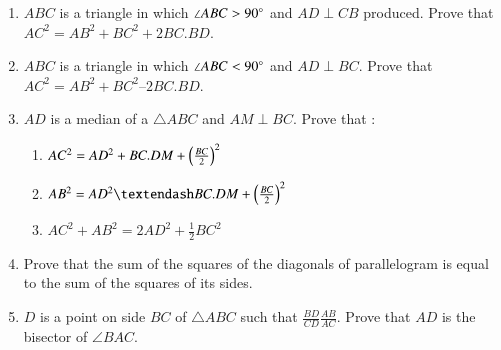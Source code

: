 \begin{enumerate}[label=\thesection.\arabic*.,ref=\thesection.\theenumi]
\item  $ABC$ is a triangle in which  $\angle  ABC > 90\degree$ and $AD  \perp  CB$ produced. Prove that
$ AC^2= AB^2 + BC^2 + 2 BC . BD$.
\item $ABC$ is a triangle in which  $\angle  ABC < 90\degree$ and $AD  \perp  BC$. Prove that $AC^2= AB^2 + BC^2 – 2 BC . BD$.
\item $AD$ is a median of a $\triangle ABC$ and $AM  \perp  BC$. Prove that :
\begin{enumerate}
\item  $AC^2 = AD^2 + BC . DM +
\left(\frac{BC}{ 2}\right)^2$
\item  $AB^2 = AD^2 – BC . DM + \brak{\frac{BC}{ 2}}^
2 $
\item  $AC^2 + AB^2 = 2 AD^2 + \frac{1}{ 2} BC^2$
\end{enumerate}
\item Prove that the sum of the squares of the diagonals of parallelogram is equal to the sum of the squares of its sides.
\item   $D$ is a point on side $BC$ of  $\triangle  ABC$ such that
$\frac{BD}{CD} \frac{AB}{AC}  $.  Prove that $AD$ is the bisector of  $\angle  BAC$.
\end{enumerate}


